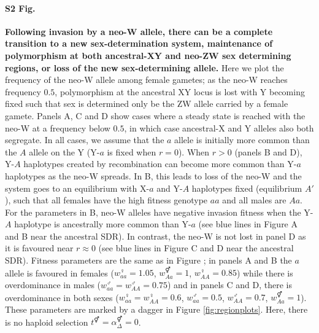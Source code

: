 \documentclass[10pt,letterpaper]{article}
\begin{document}
\paragraph*{S2 Fig.}
\label{fig:temporalOverdominance}
{\bf Following invasion by a neo-W allele, there can be a complete transition to a new sex-determination system, maintenance of polymorphism at both ancestral-XY and neo-ZW sex determining regions, or loss of the new sex-determining allele. } 
Here we plot the frequency of the neo-W allele among female gametes; as the neo-W reaches frequency $0.5$, polymorphism at the ancestral XY locus is lost with Y becoming fixed such that sex is determined only be the ZW allele carried by a female gamete. 
Panels A, C and D show cases where a steady state is reached with the neo-W at a frequency below $0.5$, in which case ancestral-X and Y alleles also both segregate. 
In all cases, we assume that the $a$ allele is initially more common than the $A$ allele on the Y (Y-$a$ is fixed when $r=0$). 
When $r>0$ (panels B and D), Y-$A$ haplotypes created by recombination can become more common than Y-$a$ haplotypes as the neo-W spreads.
In B, this leads to loss of the neo-W and the system goes to an equilibrium with X-$a$ and Y-$A$ haplotypes fixed (equilibrium $A'$), such that all females have the high fitness genotype $aa$ and all males are $Aa$. 
For the parameters in B, neo-W alleles have negative invasion fitness when the Y-$A$ haplotype is ancestrally more common than Y-$a$ (see blue lines in Figure A and  B near the ancestral SDR). 
In contrast, the neo-W is not lost in panel D as it is favoured near $r\approx0$ (see blue lines in Figure C and  D near the ancestral SDR). 
Fitness parameters are the same as in Figure ; in panels A and B the $a$ allele is favoured in females ($w_{aa}^\female=1.05$, $w_{Aa}^\Hermaphrodite=1$, $w_{AA}^\female=0.85$) while there is overdominance in males ($w_{aa}^\male=w_{AA}^\male=0.75$) and in panels C and D, there is overdominance in both sexes ($w_{aa}^\female=w_{AA}^\female=0.6$, $w_{aa}^\male=0.5$, $w_{AA}^\male=0.7$, $w_{Aa}^\Hermaphrodite=1$). 
These parameters are marked by a dagger in Figure \ref{fig:regionplots}. 
Here, there is no haploid selection $t^\Hermaphrodite = \alpha^\Hermaphrodite_\Delta = 0$.
\end{document}
